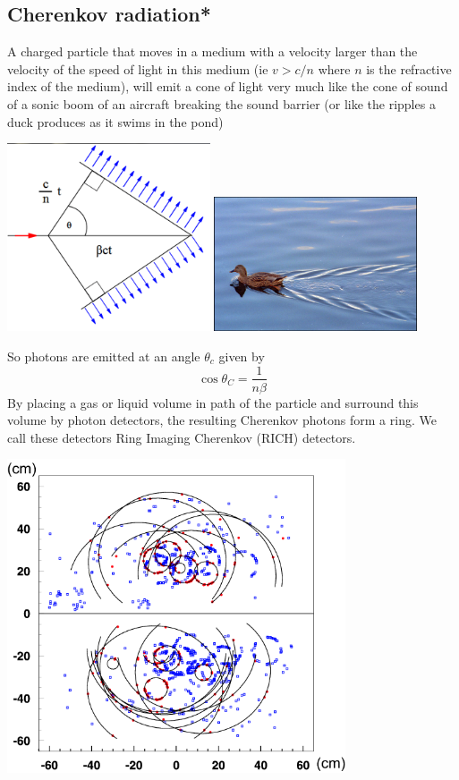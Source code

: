 \subsection{Cherenkov radiation*}
A charged particle that moves in a medium with a velocity larger than the velocity of the speed of light in this medium (ie $v>c/n$ where $n$ is the refractive index of the medium), will emit a cone of light very much like the cone of sound of a sonic boom of an aircraft breaking the sound barrier (or like the ripples a duck produces as it swims in the pond)
\begin{center}
\includegraphics[width=0.45\textwidth]{fig/detector/cherenkov_angle.png}
\includegraphics[width=0.45\textwidth]{fig/detector/duck_angle.png}
\end{center}
So photons are emitted at an angle $\theta_c$ given by 
\begin{equation}
\label{eq:cherenkov_angle}
\cos\theta_{C}=\frac{1}{n\beta}
\end{equation}
By placing a gas or liquid volume in path of the particle and surround this volume by photon detectors, the resulting Cherenkov photons form a ring. We call these detectors Ring Imaging Cherenkov (RICH) detectors. 
\begin{center}
\includegraphics[width=0.75\textwidth]{fig/detector/rich_1_rings.png}
\end{center}

